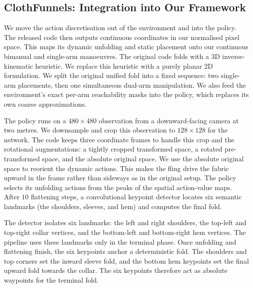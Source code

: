 \documentclass[journal]{IEEEtran}
\begin{document}
\subsection{ClothFunnels: Integration into Our Framework}
We move the action discretisation out of the environment and into the policy. The released code then outputs continuous coordinates in our normalised pixel space. This maps its dynamic unfolding and static placement onto our continuous bimanual and single-arm manoeuvres. The original code folds with a 3D inverse-kinematic heuristic. We replace this heuristic with a purely planar 2D formulation. We split the original unified fold into a fixed sequence: two single-arm placements, then one simultaneous dual-arm manipulation. We also feed the environment's exact per-arm reachability masks into the policy, which replaces its own coarse approximations.

The policy runs on a $480 \times 480$ observation from a downward-facing camera at two metres. We downsample and crop this observation to $128 \times 128$ for the network. The code keeps three coordinate frames to handle this crop and the rotational augmentations: a tightly cropped transformed space, a rotated pre-transformed space, and the absolute original space. We use the absolute original space to reorient the dynamic actions. This makes the fling drive the fabric upward in the frame rather than sideways as in the original setup. The policy selects its unfolding actions from the peaks of the spatial action-value maps. After $10$ flattening steps, a convolutional keypoint detector locates six semantic landmarks (the shoulders, sleeves, and hem) and computes the final fold.

The detector isolates six landmarks: the left and right shoulders, the top-left and top-right collar vertices, and the bottom-left and bottom-right hem vertices. The pipeline uses these landmarks only in the terminal phase. Once unfolding and flattening finish, the six keypoints anchor a deterministic fold. The shoulders and top corners set the inward sleeve fold, and the bottom hem keypoints set the final upward fold towards the collar. The six keypoints therefore act as absolute waypoints for the terminal fold.
\end{document}
